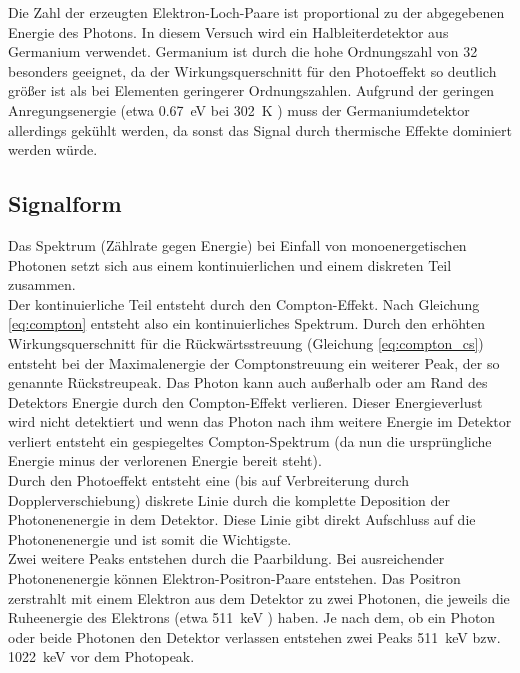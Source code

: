 Die Zahl der erzeugten Elektron-Loch-Paare ist proportional zu der abgegebenen Energie des Photons. In diesem Versuch wird ein Halbleiterdetektor aus Germanium verwendet. Germanium ist durch die hohe Ordnungszahl von 32 besonders geeignet, da der Wirkungsquerschnitt für den Photoeffekt so deutlich größer ist als bei Elementen geringerer Ordnungszahlen. Aufgrund der geringen Anregungsenergie (etwa \SI{0.67}{\electronvolt} bei \SI{302}{\kelvin} \cite{bandgap}) muss der Germaniumdetektor allerdings gekühlt werden, da sonst das Signal durch thermische Effekte dominiert werden würde.

\subsection{Signalform}
Das Spektrum (Zählrate gegen Energie) bei Einfall von monoenergetischen Photonen setzt sich aus einem kontinuierlichen und einem diskreten Teil zusammen.\\

 Der kontinuierliche Teil entsteht durch den Compton-Effekt. Nach Gleichung \ref{eq:compton} entsteht also ein kontinuierliches Spektrum. Durch den erhöhten Wirkungsquerschnitt für die Rückwärtsstreuung (Gleichung \ref{eq:compton_cs}) entsteht bei der Maximalenergie der Comptonstreuung ein weiterer Peak, der so genannte Rückstreupeak. Das Photon kann auch außerhalb oder am Rand des Detektors Energie durch den Compton-Effekt verlieren. Dieser Energieverlust wird nicht detektiert und wenn das Photon nach ihm weitere Energie im Detektor verliert entsteht ein gespiegeltes Compton-Spektrum (da nun die ursprüngliche Energie minus der verlorenen Energie bereit steht). \\ 

Durch den Photoeffekt entsteht eine (bis auf Verbreiterung durch Dopplerverschiebung) diskrete Linie durch die komplette Deposition der Photonenenergie in dem Detektor. Diese Linie gibt direkt Aufschluss auf die Photonenenergie und ist somit die Wichtigste.  \\

Zwei weitere Peaks entstehen durch die Paarbildung. Bei ausreichender Photonenenergie können Elektron-Positron-Paare entstehen. Das Positron zerstrahlt mit einem Elektron aus dem Detektor zu zwei Photonen, die jeweils die Ruheenergie des Elektrons (etwa \SI{511}{\kilo\electronvolt} \cite{Agashe:2014kda}) haben. Je nach dem, ob ein Photon oder beide Photonen den Detektor verlassen entstehen zwei Peaks \SI{511}{\kilo\electronvolt} bzw. \SI{1022}{\kilo\electronvolt} vor dem Photopeak.\\

